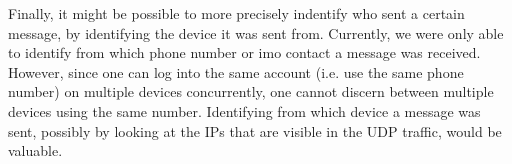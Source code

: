 \documentclass[conference]{IEEEtran}
\begin{document}
Finally, it might be possible to more precisely indentify who sent a certain
message, by identifying the device it was sent from. Currently, we were only
able to identify from which phone number or imo contact a message was received.
However, since one can log into the same account (i.e. use the same phone
number) on multiple devices concurrently, one cannot discern between multiple
devices using the same number. Identifying from which device a message was
sent, possibly by looking at the IPs that are visible in the UDP traffic, would
be valuable.


\printbibliography
\end{document}
